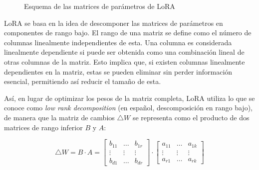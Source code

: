 \documentclass[11pt,spanish,listoffigures,listoftables]{tfgetsinf}
\begin{document}
\begin{figure}[!h]
\centering
{}
\caption{Esquema de las matrices de parámetros de LoRA}
\label{fig:matricesLoRA}
\end{figure}

LoRA se basa en la idea de descomponer las matrices de parámetros en componentes de rango bajo. El rango de una matriz se define como el número de columnas linealmente independientes de esta. Una columna es considerada linealmente dependiente si puede ser obtenida como una combinación lineal de otras columnas de la matriz. Esto implica que, si existen columnas linealmente dependientes en la matriz, estas se pueden eliminar sin perder información esencial, permitiendo así reducir el tamaño de esta.

Así, en lugar de optimizar los pesos de la matriz completa, LoRA utiliza lo que se conoce como \textit{low rank decomposition} (en español, descomposición en rango bajo), de manera que la matriz de cambios $\bigtriangleup W$ se representa como el producto de dos matrices de rango inferior $B$ y $A$:

\begin{equation}
\bigtriangleup W = B \cdot A =
\begin{bmatrix}
b_{11} & \dots & b_{1r} \\
\vdots &  \vdots & \vdots \\
b_{d1} & \dots & b_{dr}
\end{bmatrix}
\cdot
\begin{bmatrix}
a_{11} & \dots & a_{1k} \\
\vdots & \vdots & \vdots \\
a_{r1} & \dots & a_{rk}
\end{bmatrix}
\end{equation}
\end{document}

